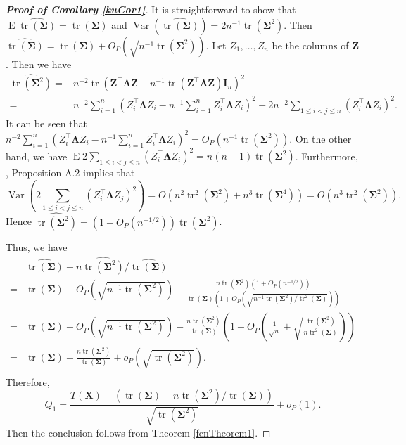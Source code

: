 \documentclass[10pt]{book}
\theoremstyle{definition}
\DeclareMathOperator{\mytr}{tr}
\DeclareMathOperator{\myE}{E}
\DeclareMathOperator{\myVar}{Var}
\newcommand{\bZ}{\mathbf{Z}}
\newcommand{\bX}{\mathbf{X}}
\newcommand{\bI}{\mathbf{I}}
\newcommand{\bfsym}[1]{\ensuremath{\boldsymbol{#1}}}
\def\bLambda {\bfsym {\Lambda}}
\def\bSigma {\bfsym {\Sigma}}
\begin{document}
\begin{proof}[\textbf{Proof of Corollary \ref{kuCor1}}]
It is straightforward to show that 
$\myE \widehat{\mytr(\bSigma)}=\mytr(\bSigma)$ and 
$\myVar \left(\widehat{\mytr(\bSigma)}\right)=2n^{-1}\mytr(\bSigma^2)$.
Then
$\widehat{\mytr(\bSigma)}=\mytr(\bSigma)+O_P(\sqrt{n^{-1}\mytr(\bSigma^2)})$.
Let $Z_1,\ldots, Z_n$ be the columns of $\bZ$.
Then we have
\begin{equation*}
    \begin{split}
\widehat{\mytr(\bSigma^2)}=&
n^{-2} \mytr(\bZ^\top \bLambda \bZ-n^{-1}\mytr(\bZ^\top \bLambda \bZ)\bI_n)^2
\\
=&
n^{-2} \sum_{i=1}^n (Z_{i}^\top \bLambda Z_i - n^{-1}\sum_{i=1}^n Z_{i}^\top \bLambda Z_i)^2
+
2n^{-2} \sum_{1\leq i < j \leq n} (Z_i^\top \bLambda Z_i)^2.
    \end{split}
\end{equation*}
It can be seen that
$
n^{-2} \sum_{i=1}^n (Z_{i}^\top \bLambda Z_i - n^{-1}\sum_{i=1}^n Z_{i}^\top \bLambda Z_i)^2
=O_P(n^{-1}\mytr(\bSigma^2))
$.
    On the other hand, we have $
\myE 2 \sum_{1\leq i < j \leq n} (Z_i^\top \bLambda Z_i)^2
=n(n-1)\mytr(\bSigma^2)
$.
    Furthermore, \cite{chen2010tests}, Proposition A.2 implies that
    \begin{equation*}
        \myVar\left(
            2\sum_{1\leq i<j\leq n} (Z_{i}^\top \bLambda Z_{j})^2
        \right)
        = O\left(
            n^2 \mytr^2 (\bSigma^2) + n^3 \mytr(\bSigma^4)
        \right)
        = O\left(
            n^3 \mytr^2 (\bSigma^2) 
        \right)
        .
    \end{equation*}
Hence $
\widehat{\mytr(\bSigma^2)}
= (1+O_P(n^{-1/2}))\mytr(\bSigma^2) 
$.

Thus, we have
\begin{equation*}
    \begin{split}
    &\widehat{\mytr(\bSigma)}-n\widehat{\mytr(\bSigma^2)}/\widehat{\mytr(\bSigma)}
    \\
    =
    &\mytr(\bSigma) +O_P(\sqrt{n^{-1}\mytr(\bSigma^2)})
    -\frac{n\mytr(\bSigma^2)(1+O_P(n^{-1/2}))}{\mytr(\bSigma)(1+O_P(\sqrt{n^{-1}\mytr(\bSigma^2)/\mytr^2(\bSigma)}))}
    \\
    =
    &\mytr(\bSigma) +O_P(\sqrt{n^{-1}\mytr(\bSigma^2)})
    -\frac{n\mytr(\bSigma^2)}{\mytr(\bSigma)}
    \left(1+O_P \left(\frac{1}{\sqrt{n}}+\sqrt{\frac{\mytr(\bSigma^2)}{n\mytr^2(\bSigma)}}\right)\right)
    \\
    =
    &\mytr(\bSigma)
    -\frac{n\mytr(\bSigma^2)}{\mytr(\bSigma)}
    +o_P(\sqrt{\mytr(\bSigma^2)}).
    \\
    \end{split}
\end{equation*}
Therefore,
\begin{equation*}
    Q_1=
        \frac{T(\bX)-\left(\mytr(\bSigma)-n\mytr(\bSigma^2)/\mytr(\bSigma)\right)}{\sqrt{\mytr(\bSigma^2)}}
        +o_P(1).
\end{equation*}
Then the conclusion follows from Theorem \ref{fenTheorem1}.
\end{proof}
\end{document}
